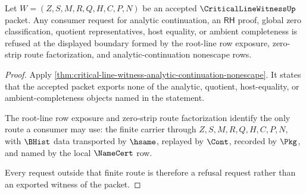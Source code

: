\begin{theorem}
\label{thm:critical-line-witness-p11961-rh-refusal-boundary}
Let $W=(Z,S,M,R,Q,H,C,P,N)$ be an accepted $\CriticalLineWitnessUp$ packet. Any consumer request for analytic continuation, an $\mathsf{RH}$ proof, global zero classification, quotient representatives, host equality, or ambient completeness is refused at the displayed boundary formed by the root-line row exposure, zero-strip route factorization, and analytic-continuation nonescape rows.
\end{theorem}
\begin{proof}
Apply \autoref{thm:critical-line-witness-analytic-continuation-nonescape}. It states that the accepted packet exports none of the analytic, quotient, host-equality, or ambient-completeness objects named in the statement.

The root-line row exposure and zero-strip route factorization identify the only route a consumer may use: the finite carrier through $Z,S,M,R,Q,H,C,P,N$, with $\BHist$ data transported by $\hsame$, replayed by $\Cont$, recorded by $\Pkg$, and named by the local $\NameCert$ row.

Every request outside that finite route is therefore a refusal request rather than an exported witness of the packet.
\end{proof}
